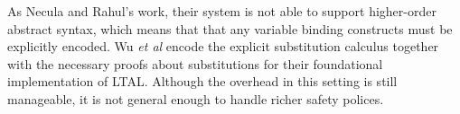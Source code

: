 \documentclass{llncs}
\begin{document}
As Necula and Rahul's work, their system is not able to support
higher-order abstract syntax, which means that that any variable
binding constructs must be explicitly encoded. Wu {\em et
  al}\cite{Appel:PPDP03} encode the explicit substitution calculus
\cite{Abadi:POPL90} together with the necessary proofs about
substitutions for their foundational implementation of LTAL. Although
the overhead in this setting is still manageable, it is not general
enough to handle richer safety polices. 







\end{document}
